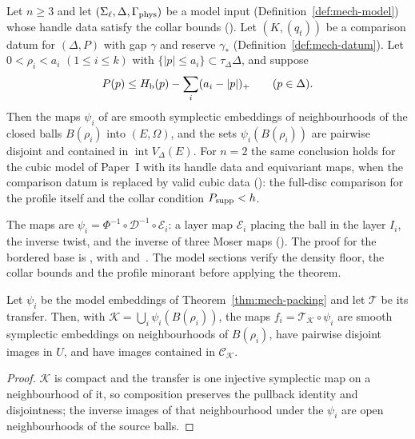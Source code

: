 \begin{theorem}\label{thm:mech-packing}
Let $n\ge3$ and let $(\Sigma_\ell,\Delta,\Gamma_{\rm phys})$ be a model input
(Definition~\ref{def:mech-model}) whose handle data satisfy the collar bounds (). Let
$(K,(q_t))$ be a comparison datum for $(\Delta,P)$ with gap $\gamma$ and reserve $\gamma_*$
(Definition~\ref{def:mech-datum}). Let $0<\rho_i<a_i$ $(1\le i\le k)$ with
$\{|p|\le a_i\}\subset\tau_\Delta\Delta$, and suppose
\[
 P(p)\le H_{\mathrm b}(p)-\sum_i(a_i-|p|)_+\qquad(p\in\Delta).
\]
Then the maps $\psi_i$ of  are smooth symplectic embeddings of
neighbourhoods of the closed balls $B(\rho_i)$ into $(E,\Omega)$, and the sets $\psi_i(B(\rho_i))$ are pairwise
disjoint and contained in $\operatorname{int}V_\Delta(E)$. For $n=2$ the same conclusion holds for the cubic model of
Paper~I with its handle data and equivariant maps, when the comparison datum is replaced by valid cubic data
(): the full-disc comparison for the profile itself and the collar condition $P_{\rm supp}<h$.
\end{theorem}

The maps are $\psi_i=\Phi^{-1}\circ\mathcal D^{-1}\circ\mathcal E_i$: a layer map $\mathcal E_i$ placing the ball in the
layer $I_i$, the inverse twist, and the inverse of three Moser maps (). The proof for the
bordered base is , with 
and~. The model sections verify the density floor, the collar bounds and the profile
minorant before applying the theorem.

\begin{proposition}[Assembly]\label{prop:mech-assembly}
Let $\psi_i$ be the model embeddings of Theorem~\ref{thm:mech-packing} and let $\mathcal T$ be its transfer.
Then, with $\mathcal K=\bigcup_i\psi_i(B(\rho_i))$, the maps
$f_i=\mathcal T_{\mathcal K}\circ\psi_i$ are smooth symplectic embeddings on neighbourhoods of
$B(\rho_i)$, have pairwise disjoint images in $U$, and have images contained in $\mathcal C_{\mathcal K}$.
\end{proposition}
\begin{proof}
$\mathcal K$ is compact and the transfer is one injective symplectic map on a neighbourhood of it, so composition
preserves the pullback identity and disjointness; the inverse images of that neighbourhood under the $\psi_i$ are open
neighbourhoods of the source balls.
\end{proof}


